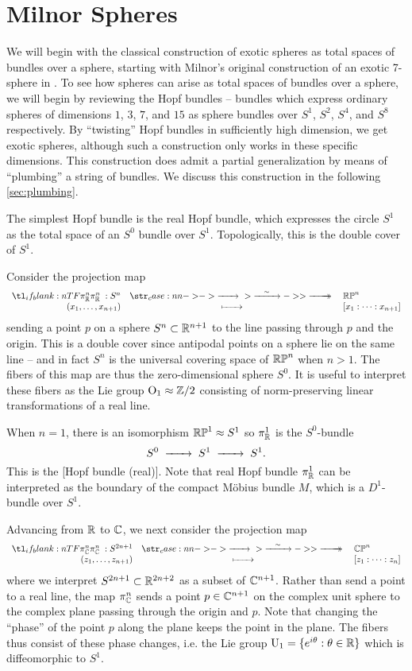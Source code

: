 \section{Milnor Spheres}\label{sec:milnor-spheres}

We will begin with the classical construction of exotic spheres as total spaces of bundles over a sphere, starting with Milnor's original construction of an exotic 7-sphere in \cite{milnor1956manifolds}.
To see how spheres can arise as total spaces of bundles over a sphere, we will begin by reviewing the Hopf bundles -- bundles which express ordinary spheres of dimensions $1$, $3$, $7$, and $15$ as sphere bundles over $S^1$, $S^2$, $S^4$, and $S^8$ respectively. By ``twisting'' Hopf bundles in sufficiently high dimension, we get exotic spheres, although such a construction only works in these specific dimensions. This construction does admit a partial generalization by means of ``plumbing'' a string of bundles. We discuss this construction in the following \cref{sec:plumbing}.

The simplest Hopf bundle is the real Hopf bundle, which expresses the circle $S^1$ as the total space of an $S^0$ bundle over $S^1$. Topologically, this is the double cover of $S^1$. 

Consider the projection map
\[
	\lkxfunc{\pi_\R^n}{S^n}{\RP^n}{(x_1,\ldots, x_{n+1})}{[x_1:\cdots: x_{n+1}]}
\]
sending a point $p$ on a sphere $S^n\subset \mathbb{R}^{n+1}$ to the line passing through $p$ and the origin. This is a double cover since antipodal points on a sphere lie on the same line -- and in fact $S^n$ is the universal covering space of $\mathbb{RP}^n$ when $n>1$. The fibers of this map are thus the zero-dimensional sphere $S^0$. It is useful to interpret these fibers as the Lie group $\mathrm{O}_1\approx \mathbb{Z}/2$ consisting of norm-preserving linear transformations of a real line.

When $n=1$, there is an isomorphism $\mathbb{RP}^1\approx S^1$ so $\pi_{\mathbb{R}}^1$ is the $S^0$-bundle
\[
	S^0 \lkxto S^1\lkxto S^1.
\]
This is the [Hopf bundle (real)].
Note that real Hopf bundle $\pi_{\mathbb{R}}^1$ can be interpreted as the boundary of the compact M\"obius bundle $M$, which is a $D^1$-bundle over $S^1$.

Advancing from $\mathbb{R}$ to $\mathbb{C}$, we next consider the projection map
\[
	\lkxfunc{\pi_\C^n}{S^{2n+1}}{\CP^n}{(z_1,\ldots, z_{n+1})}{[z_1:\cdots: z_n]}
\]
where we interpret $S^{2n+1}\subset \mathbb{R}^{2n+2}$ as a subset of $\mathbb{C}^{n+1}$. Rather than send a point to a real line, the map $\pi_{\mathbb{C}}^n$ sends a point $p\in \mathbb{C}^{n+1}$ on the complex unit sphere to the complex plane passing through the origin and $p$. Note that changing the ``phase'' of the point $p$ along the plane keeps the point in the plane. The fibers thus consist of these phase changes, i.e. the Lie group $\mathrm{U}_1=\{e^{i\theta} : \theta\in \mathbb{R}\}$ which is diffeomorphic to $S^1$.

